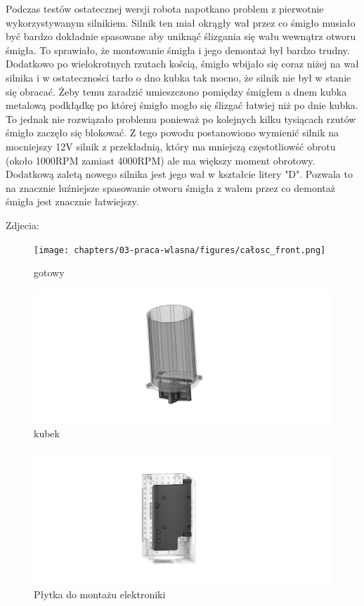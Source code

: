 Podczas testów ostatecznej wersji robota napotkano problem z pierwotnie wykorzystywanym silnikiem. Silnik ten miał okrągły wał przez co śmigło musiało
być bardzo dokładnie spasowane aby uniknąć ślizgania się wału wewnątrz otworu śmigła. To sprawiało, że montowanie śmigła i jego demontaż był bardzo trudny. Dodatkowo po wielokrotnych rzutach kością, śmigło
wbijało się coraz niżej na wał silnika i w ostateczności tarło o dno kubka tak mocno, że silnik nie był w stanie się obracać. 
Żeby temu zaradzić umieszczono pomiędzy śmigłem a dnem kubka metalową podkłądkę po której śmigło mogło się ślizgać łatwiej niż po dnie kubka. To
jednak nie rozwiązało problemu ponieważ po kolejnych kilku tysiącach rzutów śmigło zaczęło się blokować. 
Z tego powodu postanowiono wymienić silnik na mocniejszy 12V silnik z przekładnią, który ma mniejszą częstotliowść obrotu (około 1000RPM zamiast 4000RPM) ale ma większy moment obrotowy.
Dodatkową zaletą nowego silnika jest jego wał w kształcie litery "D". Pozwala to na znacznie luźniejsze spasowanie otworu śmigła z wałem przez co 
demontaż śmigła jest znacznie łatwiejszy.

Zdjecia:
\begin{figure}[H]
    \centering
    \texttt{[image: chapters/03-praca-wlasna/figures/całosc\_front.png]}
    \caption{\label{fig:gotowy}gotowy}
\end{figure}

\begin{figure}[H]
    \centering
    \includegraphics[width=0.95\linewidth]{chapters/03-praca-wlasna/figures/kubek_smiglo_uchwyt.png}
    \caption{\label{fig:kubek}kubek}
\end{figure}

\begin{figure}[H]
    \centering
    \includegraphics[width=0.95\linewidth]{chapters/03-praca-wlasna/figures/main_board.png}
    \caption{\label{fig:mainboard}Płytka do montażu elektroniki}
\end{figure}

